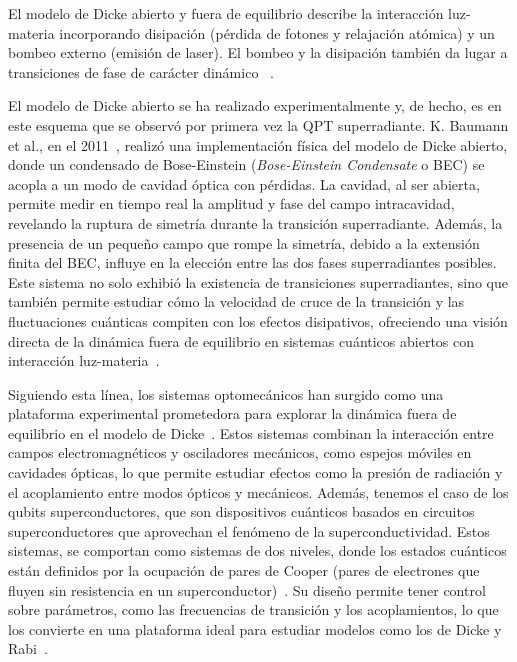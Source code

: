 \documentclass[onecolumn,notitlepage,letterpaper,aps,pra,12pt]{article}
\numberwithin{equation}{section}
\begin{document}
El modelo de Dicke abierto y fuera de equilibrio describe la interacción luz-materia incorporando disipación (pérdida de fotones y relajación atómica) y un bombeo externo (emisión de laser). El bombeo y la disipación también da lugar a transiciones de fase de carácter dinámico%
~\cite{kirton2017,LeBoite2020}. 

El modelo de Dicke abierto se ha realizado experimentalmente y, de hecho, es en este esquema que se observó por primera vez la QPT superradiante. K. Baumann et al., en el 2011~\cite{Baumann11}, realizó una implementación física del modelo de Dicke abierto, donde un condensado de Bose-Einstein (\textit{Bose-Einstein Condensate} o BEC) se acopla a un modo de cavidad óptica con pérdidas. La cavidad, al ser abierta, permite medir en tiempo real la amplitud y fase del campo intracavidad, revelando la ruptura de simetría durante la transición superradiante. Además, la presencia de un pequeño campo que rompe la simetría, debido a la extensión finita del BEC, influye en la elección entre las dos fases superradiantes posibles. Este sistema no solo exhibió la existencia de transiciones superradiantes, sino que también permite estudiar cómo la velocidad de cruce de la transición y las fluctuaciones cuánticas compiten con los efectos disipativos, ofreciendo una visión directa de la dinámica fuera de equilibrio en sistemas cuánticos abiertos con interacción luz-materia~\cite{Baumann10}.

Siguiendo esta línea, los sistemas optomecánicos han surgido como una plataforma experimental prometedora para explorar la dinámica fuera de equilibrio en el modelo de Dicke~\cite{debnath2015}. Estos sistemas combinan la interacción entre campos electromagnéticos y osciladores mecánicos, como espejos móviles en cavidades ópticas, lo que permite estudiar efectos como la presión de radiación y el acoplamiento entre modos ópticos y mecánicos. Además, tenemos el caso de los qubits superconductores, que son dispositivos cuánticos basados en circuitos superconductores que aprovechan el fenómeno de la superconductividad. Estos sistemas, se comportan como sistemas de dos niveles, donde los estados cuánticos están definidos por la ocupación de pares de Cooper (pares de electrones que fluyen sin resistencia en un superconductor)~\cite{Lamata2017}. Su diseño permite tener control sobre parámetros, como las frecuencias de transición y los acoplamientos, lo que los convierte en una plataforma ideal para estudiar modelos como los de Dicke y Rabi~\cite{Mezzacapo14}. 
\end{document}
